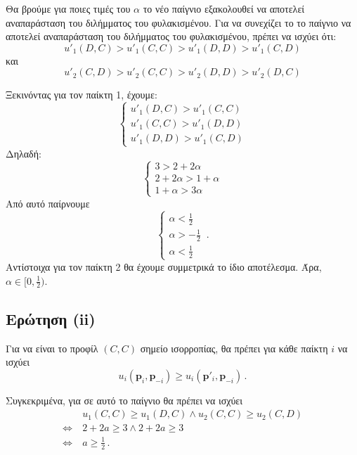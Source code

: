 Θα βρούμε για ποιες τιμές του $\alpha$ το νέο παίγνιο εξακολουθεί να αποτελεί
αναπαράσταση του διλήμματος του φυλακισμένου. Για να συνεχίζει το το παίγνιο να
αποτελεί αναπαράσταση του διλήμματος του φυλακισμένου, πρέπει να ισχύει ότι:
$$
u'_1(D, C) > u'_1(C, C) > u'_1(D, D) > u'_1(C, D)
$$
και
$$
u'_2(C, D) > u'_2(C, C) > u'_2(D, D) > u'_2(D, C)
$$

Ξεκινόντας για τον παίκτη 1, έχουμε:
$$
\begin{cases}
  u'_1(D, C) > u'_1(C, C) \\
  u'_1(C, C) > u'_1(D, D) \\
  u'_1(D, D) > u'_1(C, D)
\end{cases}
$$
Δηλαδή:
$$
\begin{cases}
  3 > 2 + 2\alpha \\
  2 + 2\alpha > 1 + \alpha \\
  1 + \alpha > 3\alpha
\end{cases}
$$
Από αυτό παίρνουμε
$$
\begin{cases}
  \alpha < \frac{1}{2} \\
  \alpha > -\frac{1}{2} \\
  \alpha < \frac{1}{2}
\end{cases}
\,.$$
Αντίστοιχα για τον παίκτη 2 θα έχουμε συμμετρικά το ίδιο αποτέλεσμα. Άρα,
$\alpha \in [0, \frac{1}{2})$.

\subsection{Ερώτηση (ii)}

Για να είναι το προφίλ $(C, C)$ σημείο ισορροπίας, θα πρέπει για κάθε παίκτη $i$
να ισχύει
$$
    u_i(\textbf{p}_i, \textbf{p}_{-i}) \geq u_i(\textbf{p}'_i, \textbf{p}_{-i}) \,.
$$

Συγκεκριμένα, για σε αυτό το παίγνιο θα πρέπει να ισχύει
\begin{align*}
    & u_1(C, C) \geq u_1(D, C) \land u_2(C, C) \geq u_2(C, D) \\
    \Leftrightarrow\ & 2 + 2a \geq 3 \land 2 + 2a \geq 3 \\
    \Leftrightarrow\ & a \geq \frac{1}{2} \,.
\end{align*}
